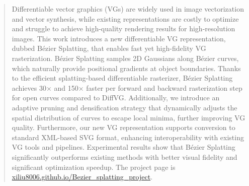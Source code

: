 
\begin{abstract}
Differentiable vector graphics (VGs) are widely used in image vectorization and vector synthesis, while existing representations are costly to optimize and struggle to achieve high-quality rendering results for high-resolution images. This work introduces a new differentiable VG representation, dubbed Bézier Splatting, that enables fast yet high-fidelity VG rasterization. Bézier Splatting samples 2D Gaussians along Bézier curves, which naturally provide positional gradients at object boundaries. Thanks to the efficient splatting-based differentiable rasterizer, Bézier Splatting achieves 30× and 150× faster per forward and backward rasterization step for open curves compared to DiffVG. Additionally, we introduce an adaptive pruning and densification strategy that dynamically adjusts the spatial distribution of curves to escape local minima, further improving VG quality. Furthermore, our new VG representation supports conversion to standard XML-based SVG format, enhancing interoperability with existing VG tools and pipelines. Experimental results show that Bézier Splatting significantly outperforms existing methods with better visual fidelity and significant optimization speedup. 
The project page is \href{https://xiliu8006.github.io/Bezier_splatting_project/}{\color{red!60!red} xiliu8006.github.io/Bezier\_splatting\_project}.
\end{abstract}